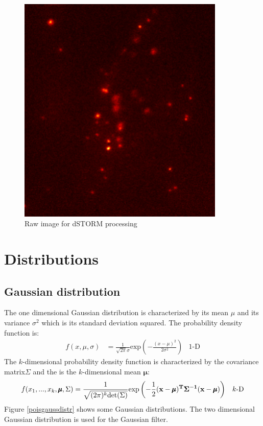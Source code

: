 \begin{figure}
\centering
\includegraphics[width = 0.88\textwidth]{pictures/Pos2_2_red2-2frame2475Color.png}
	\caption{Raw image for dSTORM processing}
	\label{rawStorm}
\end{figure}


\section{Distributions}
\subsection{Gaussian distribution}
The one dimensional Gaussian distribution is characterized by its mean $\mu$ and its variance $\sigma^2$ which is its standard deviation squared. The probability density function is:
\begin{align}
f(x,\mu,\sigma) &= \frac{1}{\sqrt{2\pi}\sigma}\text{exp}\left(-\frac{(x-\mu)^2}{2\sigma^2}\right)&\text{1-D}
\end{align}
The $k$-dimensional probability density function is characterized by the covariance matrix$\Sigma$ and the is the $k$-dimensional mean $\pmb{\mu}$:
\begin{align}
f(x_1,...,x_k,\pmb{\mu},\Sigma)&=\frac{1}{\sqrt{(2\pi)^k \text{det}(\Sigma)}}\text{exp}\left(-\frac{1}{2}(\bf{x}-\pmb{\mu})^T\Sigma^{-1}(\bf{x}-\pmb{\mu})\right) &\text{$k$-D}
\end{align}
Figure \ref{poisgaussdistr} shows some Gaussian distributions. The two dimensional Gaussian distribution is used for the Gaussian filter.
